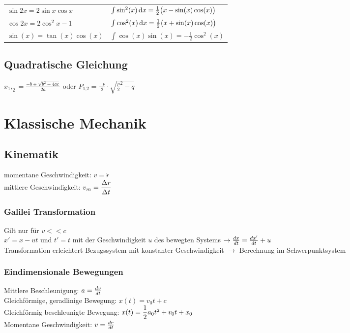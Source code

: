 \documentclass[fs, footer]{latex4ei}
\begin{document}
\begin{multicols*}{4}
\begin{tabular}{l  l}
 	$\sin 2x = 2 \sin x \cos x $  & $\int \sin^2(x) \diff x = \frac12 \bigl(x - \sin(x)\cos(x) \bigr)$\\
     
 	$\cos 2x = 2\cos^2 x - 1$  & $\int \cos^2(x) \diff x = \frac12 \bigl(x + \sin(x)\cos(x) \bigr)$\\

 	$\sin(x) = \tan(x)\cos(x)$ & $\int \cos(x)\sin(x) = -\frac12 \cos^2(x)$ \\
\end{tabular}
\fi

\subsection{Quadratische Gleichung}
$x_1,_2 = \frac{-b \pm \sqrt{b^2 - 4ac}}{2a}$ oder $P_{\text{1,2}} = \frac{-p}{2}\cdot\sqrt{\frac{p}{2}^2 - q}$\\




\section{Klassische Mechanik}



\subsection{Kinematik}
momentane Geschwindigkeit: $v = \dot r$\\
mittlere Geschwindigkeit: $v_m = \dfrac{\Delta r}{\Delta t}$\\
\subsubsection{Galilei Transformation}
Gilt nur für $v<<c$\\
$x' = x - ut$ und $t' = t$ mit der Geschwindigkeit $u$ des bewegten Systems $\rightarrow \frac{dx}{dt} = \frac{dx'}{dt} + u$\\
Transformation erleichtert Bezugssystem mit konstanter Geschwindigkeit
$\rightarrow$ Berechnung im Schwerpunktsystem
\subsubsection{Eindimensionale Bewegungen}
Mittlere Beschleunigung: $a = \frac{dv}{dt}$\\
Gleichförmige, geradlinige Bewegung: $x(t) = v_0t+c$\\
Gleichförmig beschleunigte Bewegung: $x(t) = \dfrac{1}{2}a_0t^2+v_0t+x_0$\\
Momentane Geschwindigkeit: $v = \frac{dr}{dt}$\\

\end{multicols*}
\end{document}
